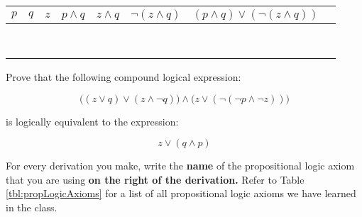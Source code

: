 \documentclass[letterpaper,12pt]{article}
\begin{document}
\begin{center}
	\begin{table}[H] 
		\Large 
		\setlength{\tabcolsep}{16pt}
		\begin{tabular}{|c|c|c|c|c|c|c| p{5.25in}|} \hline 
			$p$ & $q$ & $z$ & $p \land q$ & $z \land q$ & $ \neg (z \land q)$ & $(p \land q ) \lor (\neg (z \land q)) $\\ \hline
			\F & \F & \F & & & &   \\ \hline 		
			\F & \F & \T & & & & \\ \hline 		
			\F & \T & \F & & & &  \\ \hline 		
			\F & \T & \T & & & &\\ \hline
			\T & \F & \F & & & &\\ \hline 		
			\T & \F & \T & & & &\\ \hline
			\T & \T & \F & & & &\\ \hline 		
			\T & \T & \T & & & &\\ \hline												
		\end{tabular}
	\end{table}
\end{center} \vspace{-1in}

\freespace

\pagebreak


Prove that the following compound logical expression:

{\Large $$ \big (   ( z \lor q  ) \lor   ( z \land \neg q   )  \big ) \land  \big ( z \lor   ( \neg    ( \neg p \land \neg z   )   )  \big )$$ }
\vspace{-.1in}

is logically equivalent to the expression:

{\Large $$z \lor (q \land p) $$ }

For every derivation you make, write the \textbf{name} of the propositional logic axiom that you are using \textbf{on the right of the derivation.} Refer to Table \ref{tbl:propLogicAxioms} for a list of all propositional logic axioms we have learned in the class.



\newcommand{\emptybox}[1]{\framebox(#1,#1){} }
 
\end{document}
